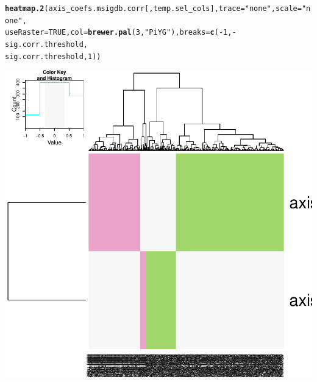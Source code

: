 \documentclass{article}\usepackage[]{graphicx}\usepackage[]{color}
\makeatletter
\def\maxwidth{ %
  \ifdim\Gin@nat@width>\linewidth
    \linewidth
  \else
    \Gin@nat@width
  \fi
}
\newcommand{\hlnum}[1]{\textcolor[rgb]{0.686,0.059,0.569}{#1}}%
\newcommand{\hlstr}[1]{\textcolor[rgb]{0.192,0.494,0.8}{#1}}%
\newcommand{\hlopt}[1]{\textcolor[rgb]{0,0,0}{#1}}%
\newcommand{\hlstd}[1]{\textcolor[rgb]{0.345,0.345,0.345}{#1}}%
\newcommand{\hlkwc}[1]{\textcolor[rgb]{0.333,0.667,0.333}{#1}}%
\newcommand{\hlkwd}[1]{\textcolor[rgb]{0.737,0.353,0.396}{\textbf{#1}}}%
\newenvironment{kframe}{%
 \def\at@end@of@kframe{}%
 \ifinner\ifhmode%
  \def\at@end@of@kframe{\end{minipage}}%
  \begin{minipage}{\columnwidth}%
 \fi\fi%
 \def\FrameCommand##1{\hskip\@totalleftmargin \hskip-\fboxsep
 \colorbox{shadecolor}{##1}\hskip-\fboxsep
     \hskip-\linewidth \hskip-\@totalleftmargin \hskip\columnwidth}%
 \MakeFramed {\advance\hsize-\width
   \@totalleftmargin\z@ \linewidth\hsize
   \@setminipage}}%
 {\par\unskip\endMakeFramed%
 \at@end@of@kframe}
\newenvironment{knitrout}{}{} %
\makeatother
\begin{document}
\begin{knitrout}
{}


\begin{kframe}\begin{alltt}
\hlkwd{heatmap.2}\hlstd{(axis_coefs.msigdb.corr[, temp.sel_cols],} \hlkwc{trace} \hlstd{=} \hlstr{"none"}\hlstd{,} \hlkwc{scale} \hlstd{=} \hlstr{"none"}\hlstd{,}
    \hlkwc{useRaster} \hlstd{=} \hlnum{TRUE}\hlstd{,} \hlkwc{col} \hlstd{=} \hlkwd{brewer.pal}\hlstd{(}\hlnum{3}\hlstd{,} \hlstr{"PiYG"}\hlstd{),} \hlkwc{breaks} \hlstd{=} \hlkwd{c}\hlstd{(}\hlopt{-}\hlnum{1}\hlstd{,} \hlopt{-}\hlstd{sig.corr.threshold,}
        \hlstd{sig.corr.threshold,} \hlnum{1}\hlstd{))}
\end{alltt}
\end{kframe}

{\centering \includegraphics[width=\maxwidth]{figure/nmf-msigdb-cor-plots-2} 

}



\end{knitrout}
\end{document}
